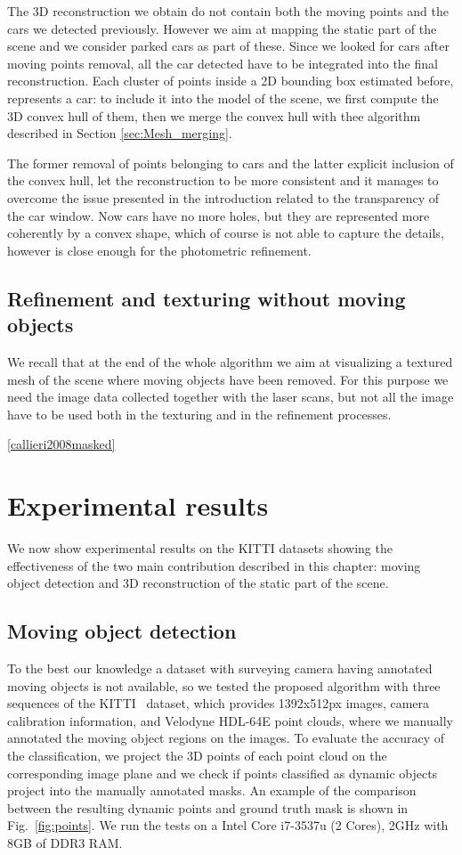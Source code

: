 The 3D reconstruction we obtain do not contain both the moving points and the cars we detected previously. 
However we aim at mapping the static part of the scene and we consider parked cars as part of these. Since we looked for cars after moving points removal, all the car detected have to be integrated into the final reconstruction. 
Each cluster of points inside a 2D bounding box estimated before, represents a car: to include it into the model of the scene, we first compute the 3D convex hull of them, then we merge the convex hull with thee algorithm described in Section \ref{sec:Mesh_merging}.

The former removal of points belonging to cars and the latter explicit inclusion of the convex hull, let the reconstruction to be more consistent and it manages to overcome the issue presented in the introduction related to the transparency of the car window. Now cars have no more holes, but they are represented more coherently by a convex shape, which of course is not able to capture the details, however is close enough for the photometric refinement.
 
\subsection{Refinement and texturing without moving objects}
We recall that at the end of the whole algorithm we aim at visualizing a textured mesh of the scene where moving objects have been removed. 
For this purpose we need the image data collected together with the laser scans, but not all the image have to be used both in the texturing and in the refinement processes.

\ref{callieri2008masked}
\section{Experimental results}%
\label{sec:experiments}
We now show experimental results on the KITTI datasets showing the effectiveness of the two main contribution described in this chapter: moving object detection and 3D reconstruction of the static part of the scene.
\subsection{Moving object detection}
To the best our knowledge a dataset with surveying camera having annotated moving objects is not available, so we tested the proposed algorithm with three sequences of the KITTI~\cite{Kitti} dataset, which provides 1392x512px images, camera calibration information, and Velodyne HDL-64E point clouds, where we manually annotated the moving object regions on the images. To evaluate the accuracy of the classification, we project the 3D points of each point cloud on the corresponding image plane and we check if points classified as dynamic objects project into the manually annotated masks. An example of the comparison between the resulting dynamic points and ground truth mask is shown in Fig.~\ref{fig:points}.
We run the tests on a  Intel Core i7-3537u (2 Cores), 2GHz with 8GB of DDR3 RAM. 

